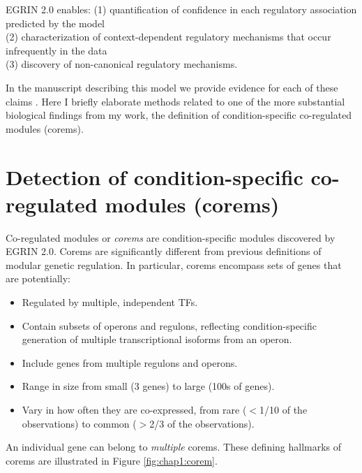 \documentclass{article}
\newenvironment{gbar}[1]{ %
\def\FrameCommand{{\color{#1}\vrule width 3 pt } \colorbox{light-gray}}%
\MakeFramed{\advance\hsize-\width\FrameRestore }}%
{\endMakeFramed}
\begin{document}
\begin{bclogo}[logo =\bcinfo , barre = none , noborder = true]{EGRIN 2.0 enables:}%
\begin{gbar}{blue}
{
(1) quantification of confidence in each regulatory association predicted by the model\\ (2) characterization of context-dependent regulatory mechanisms that occur infrequently in the data\\ (3) discovery of non-canonical regulatory mechanisms. 
}
\end{gbar}
\end{bclogo}
\vspace{5mm}

\noindent In the manuscript describing this model we provide evidence for each of these claims \cite{brooks_system_2014}. Here I briefly elaborate methods related to one of the more substantial biological findings from my work, the definition of condition-specific co-regulated modules (corems).

\section{Detection of condition-specific co-regulated modules (corems)}

Co-regulated modules or \textit{corems} are condition-specific modules discovered by EGRIN 2.0. Corems are significantly different from previous definitions of modular genetic regulation. In particular, corems encompass sets of genes that are potentially:

\begin{itemize}
	\item Regulated by multiple, independent TFs. 
	\item Contain subsets of operons and regulons, reflecting condition-specific generation of multiple transcriptional isoforms from an operon. 
	\item Include genes from multiple regulons and operons. 
	\item Range in size from small (3 genes) to large (100s of genes). 
	\item Vary in how often they are co-expressed, from rare ($<$1/10 of the observations) to common ($>$2/3 of the observations). 
\end{itemize}

\noindent An individual gene can belong to \textit{multiple} corems. These defining hallmarks of corems are illustrated in Figure \ref{fig:chap1:corem}.
\end{document}
